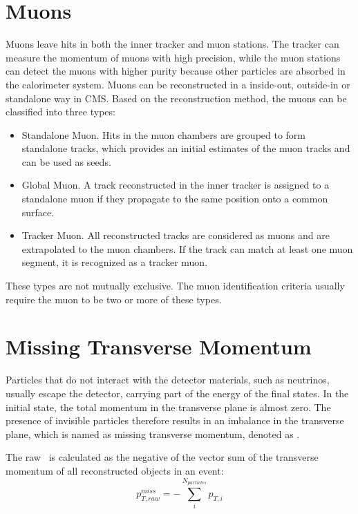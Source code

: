 \documentclass[thesis.tex]{subfiles}
\begin{document}
\section{Muons}
Muons leave hits in both the inner tracker and muon stations.
The tracker can measure the momentum of muons with high precision, while the muon stations can detect the muons with higher purity because other particles are absorbed in the calorimeter system. 
Muons can be reconstructed in a inside-out, outside-in or standalone way in CMS.
Based on the reconstruction method, the muons can be classified into three types: 
\begin{itemize}
	\item Standalone Muon. Hits in the muon chambers are grouped to form standalone tracks, which provides an initial estimates of the muon tracks and can be used as seeds.
	\item Global Muon. A track reconstructed in the inner tracker is assigned to a standalone muon if they propagate to the same position onto a common surface. 
	\item Tracker Muon. All reconstructed tracks are considered as muons and are extrapolated to the muon chambers. If the track can match at least one muon segment, it is recognized as a tracker muon. 
\end{itemize}
These types are not mutually exclusive.
The muon identification criteria usually require the muon to be two or more of these types. 

\section{Missing Transverse Momentum}
Particles that do not interact with the detector materials, such as neutrinos, usually escape the detector, carrying part of the energy of the final states.
In the initial state, the total momentum in the transverse plane is almost zero. 
The presence of invisible particles therefore results in an imbalance in the transverse plane, which is named as missing transverse momentum, denoted as \MET.

The raw \MET~is calculated as the negative of the vector sum of the transverse momentum of all reconstructed objects in an event:
\begin{equation*}
	p_{T, raw}^{miss} = - \sum_{i}^{N_{particles}}p_{T,i}
\end{equation*}
\end{document}
